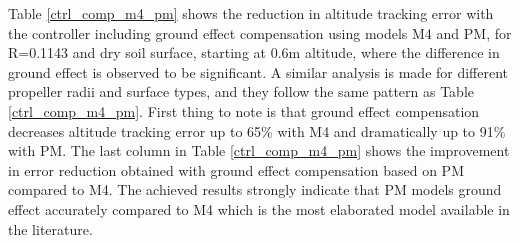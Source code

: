 \documentclass[twocolumn,10pt]{asme2ej}
\begin{document}
\begin{table}
  \small\sf\centering
  \caption{Comparison of the average altitude tracking errors of the uncompensated controller and the compensated controllers with M4 and PM, using R=0.1143 and dry soil surface.}
  \label{ctrl_comp_m4_pm}
\end{table}

Table \ref{ctrl_comp_m4_pm} shows the reduction in altitude tracking error with the controller including ground effect compensation using models M4 and PM, for R=0.1143 and dry soil surface, starting at 0.6m altitude, where the difference in ground effect is observed to be significant. A similar analysis is made for different propeller radii and surface types, and they follow the same pattern as Table \ref{ctrl_comp_m4_pm}. First thing to note is that ground effect compensation decreases altitude tracking error up to 65\% with M4 and dramatically up to 91\% with PM. The last column in Table \ref{ctrl_comp_m4_pm} shows the improvement in error reduction obtained with ground effect compensation based on PM compared to M4. The achieved results strongly indicate that PM models ground effect accurately compared to M4 which is the most elaborated model available in the literature. 
\end{document}
